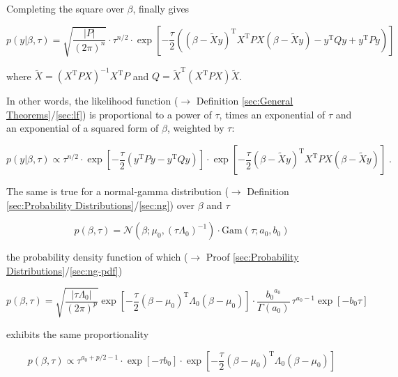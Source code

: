 \documentclass[a4paper,12pt,twoside]{book}
\begin{document}
Completing the square over $\beta$, finally gives

\begin{equation} \label{eq:blr-prior-GLM-LF-s3}
p(y|\beta,\tau) = \sqrt{\frac{|P|}{(2 \pi)^n}} \cdot \tau^{n/2} \cdot \exp\left[ -\frac{\tau}{2} \left( (\beta - \tilde{X}y)^\mathrm{T} X^\mathrm{T} P X (\beta - \tilde{X}y) - y^\mathrm{T} Q y + y^\mathrm{T} P y \right) \right]
\end{equation}

where $\tilde{X} = \left( X^\mathrm{T} P X \right)^{-1} X^\mathrm{T} P$ and $Q = \tilde{X}^\mathrm{T} \left( X^\mathrm{T} P X \right) \tilde{X}$.

\vspace{1em}
In other words, the likelihood function ($\rightarrow$ Definition \ref{sec:General Theorems}/\ref{sec:lf}) is proportional to a power of $\tau$, times an exponential of $\tau$ and an exponential of a squared form of $\beta$, weighted by $\tau$:

\begin{equation} \label{eq:blr-prior-GLM-LF-s4}
p(y|\beta,\tau) \propto \tau^{n/2} \cdot \exp\left[ -\frac{\tau}{2} \left( y^\mathrm{T} P y - y^\mathrm{T} Q y \right) \right] \cdot \exp\left[ -\frac{\tau}{2} (\beta - \tilde{X}y)^\mathrm{T} X^\mathrm{T} P X (\beta - \tilde{X}y) \right] \; .
\end{equation}

The same is true for a normal-gamma distribution ($\rightarrow$ Definition \ref{sec:Probability Distributions}/\ref{sec:ng}) over $\beta$ and $\tau$

\begin{equation} \label{eq:blr-prior-BLR-prior-s1}
p(\beta,\tau) = \mathcal{N}(\beta; \mu_0, (\tau \Lambda_0)^{-1}) \cdot \mathrm{Gam}(\tau; a_0, b_0)
\end{equation}

the probability density function of which ($\rightarrow$ Proof \ref{sec:Probability Distributions}/\ref{sec:ng-pdf})

\begin{equation} \label{eq:blr-prior-BLR-prior-s2}
p(\beta,\tau) = \sqrt{\frac{|\tau \Lambda_0|}{(2 \pi)^p}} \exp\left[ -\frac{\tau}{2} (\beta-\mu_0)^\mathrm{T} \Lambda_0 (\beta-\mu_0) \right] \cdot \frac{ {b_0}^{a_0}}{\Gamma(a_0)} \, \tau^{a_0-1} \exp[-b_0 \tau]
\end{equation}

exhibits the same proportionality

\begin{equation} \label{eq:blr-prior-BLR-prior-s3}
p(\beta,\tau) \propto \tau^{a_0+p/2-1} \cdot \exp[-\tau b_0] \cdot \exp\left[ -\frac{\tau}{2} (\beta-\mu_0)^\mathrm{T} \Lambda_0 (\beta-\mu_0) \right]
\end{equation}
\end{document}
